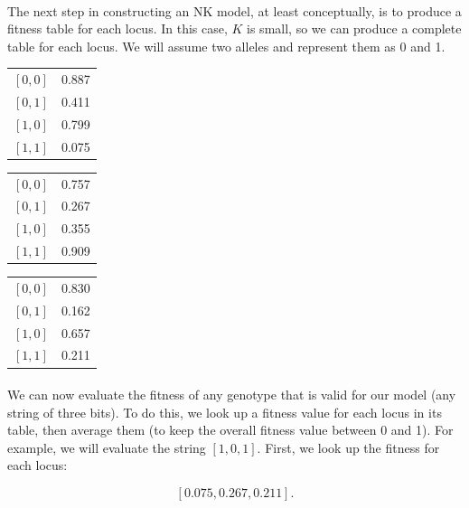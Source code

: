 \documentclass[12pt,letterpaper,titlepage]{article}
\begin{document}
\paragraph{}
The next step in constructing an NK model, at least conceptually, is to produce
a fitness table for each locus. In this case, $K$ is small, so we can produce a
complete table for each locus. We will assume two alleles and represent them as
0 and 1.

\begin{center}
    \begin{tabular}{l l}
        $\left[0, 0\right]$ & 0.887 \\
        $\left[0, 1\right]$ & 0.411 \\
        $\left[1, 0\right]$ & 0.799 \\
        $\left[1, 1\right]$ & 0.075 \\
    \end{tabular}
    \quad
    \begin{tabular}{l l}
        $\left[0, 0\right]$ & 0.757 \\
        $\left[0, 1\right]$ & 0.267 \\
        $\left[1, 0\right]$ & 0.355 \\
        $\left[1, 1\right]$ & 0.909 \\
    \end{tabular}
    \quad
    \begin{tabular}{l l}
        $\left[0, 0\right]$ & 0.830 \\
        $\left[0, 1\right]$ & 0.162 \\
        $\left[1, 0\right]$ & 0.657 \\
        $\left[1, 1\right]$ & 0.211 \\
    \end{tabular}
\end{center}

\paragraph{}
We can now evaluate the fitness of any genotype that is valid for our model
(any string of three bits). To do this, we look up a fitness value for each
locus in its table, then average them (to keep the overall fitness value
between 0 and 1). For example, we will evaluate the string
$\left[1,0,1\right]$. First, we look up the fitness for each locus:

\begin{displaymath}
    \left[0.075, 0.267, 0.211\right].
\end{displaymath}
\end{document}
